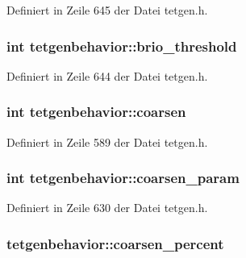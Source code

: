 Definiert in Zeile 645 der Datei tetgen.\-h.

\hypertarget{classtetgenbehavior_a0fae1ef28e8ba36da70912c73e5cc8b5}{
\subsubsection[{brio\-\_\-threshold}]{\setlength{\rightskip}{0pt plus 5cm}int tetgenbehavior\-::brio\-\_\-threshold}}\label{classtetgenbehavior_a0fae1ef28e8ba36da70912c73e5cc8b5}


Definiert in Zeile 644 der Datei tetgen.\-h.

\hypertarget{classtetgenbehavior_a58032e83757a8447015fd99d7053db8c}{
\subsubsection[{coarsen}]{\setlength{\rightskip}{0pt plus 5cm}int tetgenbehavior\-::coarsen}}\label{classtetgenbehavior_a58032e83757a8447015fd99d7053db8c}


Definiert in Zeile 589 der Datei tetgen.\-h.

\hypertarget{classtetgenbehavior_a7280448201faf01cb571b2d1d09941f1}{
\subsubsection[{coarsen\-\_\-param}]{\setlength{\rightskip}{0pt plus 5cm}int tetgenbehavior\-::coarsen\-\_\-param}}\label{classtetgenbehavior_a7280448201faf01cb571b2d1d09941f1}


Definiert in Zeile 630 der Datei tetgen.\-h.

\hypertarget{classtetgenbehavior_ac9aa3f69cf550eb2ee81fc0cae2fb444}{
\subsubsection[{coarsen\-\_\-percent}]{ tetgenbehavior\-::coarsen\-\_\-percent}}\label{classtetgenbehavior_ac9aa3f69cf550eb2ee81fc0cae2fb444}


